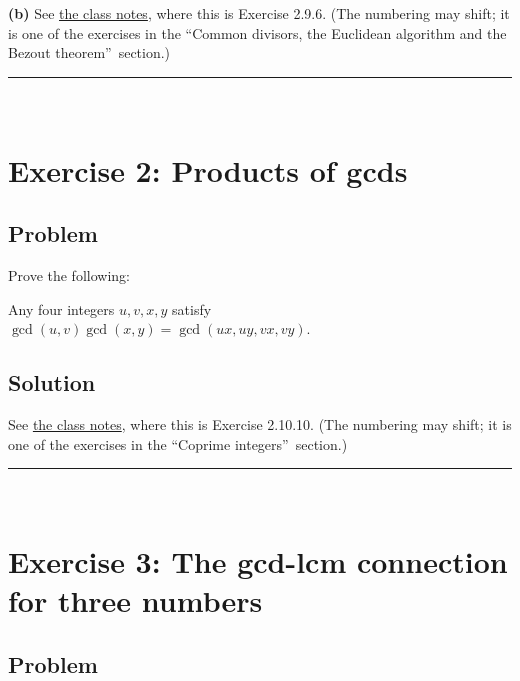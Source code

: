 \documentclass[paper=a4, fontsize=12pt]{scrartcl}%
\theoremstyle{plainsl}
\theoremstyle{definition}
\theoremstyle{remark}
\begin{document}
\textbf{(b)} See
\href{http://www-users.math.umn.edu/~dgrinber/19s/notes.pdf}{the class notes},
where this is Exercise 2.9.6. (The numbering may shift; it is one of the
exercises in the \textquotedblleft Common divisors, the Euclidean algorithm
and the Bezout theorem\textquotedblright\ section.)

\rule{\linewidth}{0.3pt} \\[0.4cm]

\section{Exercise 2: Products of gcds}

\subsection{Problem}

Prove the following:

Any four integers $u,v,x,y$ satisfy $\gcd\left(  u,v\right)  \gcd\left(
x,y\right)  =\gcd\left(  ux,uy,vx,vy\right)  $.

\subsection{Solution}

See \href{http://www-users.math.umn.edu/~dgrinber/19s/notes.pdf}{the class
notes}, where this is Exercise 2.10.10. (The numbering may shift; it is one of
the exercises in the \textquotedblleft Coprime integers\textquotedblright\ section.)

\rule{\linewidth}{0.3pt} \\[0.4cm]

\section{Exercise 3: The gcd-lcm connection for three numbers}

\subsection{Problem}
\end{document}
